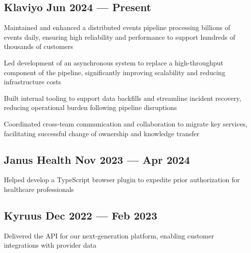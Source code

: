 
\subsection{{Klaviyo \hfill Jun 2024 --- Present}}
\begin{zitemize}
\item Maintained and enhanced a distributed events pipeline processing billions of events daily, ensuring high reliability and performance to support hundreds of thousands of customers
\item Led development of an asynchronous system to replace a high-throughput component of the pipeline, significantly improving scalability and reducing infrastructure costs
\item Built internal tooling to support data backfills and streamline incident recovery, reducing operational burden following pipeline disruptions
\item Coordinated cross-team communication and collaboration to migrate key services, facilitating successful change of ownership and knowledge transfer
\end{zitemize}

\subsection{{Janus Health \hfill Nov 2023 --- Apr 2024}}
\begin{zitemize}
\item Helped develop a TypeScript browser plugin to expedite prior authorization for healthcare professionals
\end{zitemize}

\subsection{{Kyruus \hfill Dec 2022 --- Feb 2023}}
\begin{zitemize}
\item Delivered the API for our next-generation platform, enabling customer integrations with provider data
\end{zitemize}

